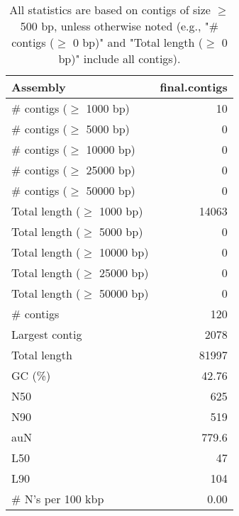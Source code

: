 \documentclass[12pt,a4paper]{article}
\begin{document}
\begin{table}[ht]
\begin{center}
\caption{All statistics are based on contigs of size $\geq$ 500 bp, unless otherwise noted (e.g., "\# contigs ($\geq$ 0 bp)" and "Total length ($\geq$ 0 bp)" include all contigs).}
\begin{tabular}{|l*{1}{|r}|}
\hline
Assembly & final.contigs \\ \hline
\# contigs ($\geq$ 1000 bp) & 10 \\ \hline
\# contigs ($\geq$ 5000 bp) & 0 \\ \hline
\# contigs ($\geq$ 10000 bp) & 0 \\ \hline
\# contigs ($\geq$ 25000 bp) & 0 \\ \hline
\# contigs ($\geq$ 50000 bp) & 0 \\ \hline
Total length ($\geq$ 1000 bp) & 14063 \\ \hline
Total length ($\geq$ 5000 bp) & 0 \\ \hline
Total length ($\geq$ 10000 bp) & 0 \\ \hline
Total length ($\geq$ 25000 bp) & 0 \\ \hline
Total length ($\geq$ 50000 bp) & 0 \\ \hline
\# contigs & 120 \\ \hline
Largest contig & 2078 \\ \hline
Total length & 81997 \\ \hline
GC (\%) & 42.76 \\ \hline
N50 & 625 \\ \hline
N90 & 519 \\ \hline
auN & 779.6 \\ \hline
L50 & 47 \\ \hline
L90 & 104 \\ \hline
\# N's per 100 kbp & 0.00 \\ \hline
\end{tabular}
\end{center}
\end{table}
\end{document}
